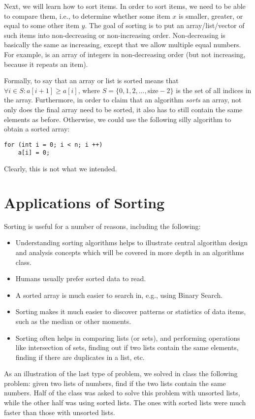 Next, we will learn how to sort items.
In order to sort items, we need to be able to compare them, i.e., 
to determine whether some item $x$ is smaller, greater, or equal to
some other item $y$. 
The goal of sorting is to put an array/list/vector of such items
into non-decreasing or non-increasing order. 
Non-decreasing is basically the same as increasing, except that we
allow multiple equal numbers. 
For example,  is an array of integers in
non-decreasing order (but not increasing, because it repeats an item).

Formally, to say that an array or list is sorted means that
$\forall i \in S: a[i+1] \geq a[i]$, 
where $S = \{0, 1, 2, ..., \text{size}-2\}$ is the set of all indices
in the array.
Furthermore, in order to claim that an algorithm \emph{sorts} an
array, not only does the final array need to be sorted, it also has to
still contain the same elements as before. Otherwise, we could use the
following silly algorithm to obtain a sorted array:
\begin{verbatim}
for (int i = 0; i < n; i ++)
    a[i] = 0;
\end{verbatim}
Clearly, this is not what we intended.

\section{Applications of Sorting}
Sorting is useful for a number of reasons, including the following:

\begin{itemize}
\item Understanding sorting algorithms helps to illustrate central
  algorithm design and analysis concepts which will be covered in more
  depth in an algorithms class.
\item Humans usually prefer sorted data to read.
\item A sorted array is much easier to search in, e.g., using Binary Search.
\item Sorting makes it much easier to discover patterns or statistics
  of data items, such as the median or other moments.
\item Sorting often helps in comparing lists (or sets), and performing
  operations like intersection of sets, finding out if two lists
  contain the same elements, finding if there are duplicates in a list,
  etc.
\end{itemize}

As an illustration of the last type of problem, we solved in class the
following problem: given two lists of numbers, find if the two lists
contain the same numbers. 
Half of the class was asked to solve this problem with unsorted lists,
while the other half was using sorted lists. 
The ones with sorted lists were much faster than those with unsorted
lists.

